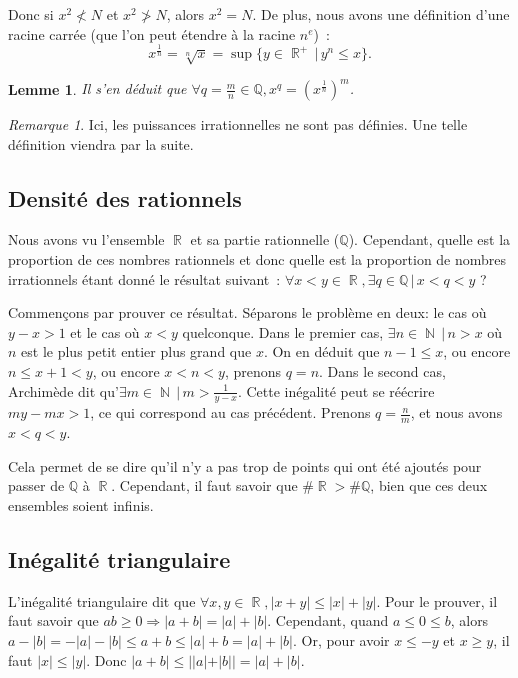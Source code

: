 \documentclass{article}
\DeclareMathOperator{\N}{\mathbb N}
\DeclareMathOperator{\R}{\mathbb R}
\newtheorem{lem}[thm]{Lemme}
\theoremstyle{definition}
\theoremstyle{remark}
\newtheorem*{rmq}{Remarque}
\begin{document}
			Donc si $x^2 \not < N$ et $x^2 \not > N$, alors $x^2 = N$. De plus, nous avons une définition d'une racine carrée (que l'on peut étendre à
			la racine $n^e$)~:
			\[x^\frac 1n = \sqrt[n] x = \sup \{y \in \R^+ \, | \, y^n \leq x\}.\]

			\begin{lem} Il s'en déduit que $\forall q = \frac mn \in \mathbb Q, x^q = (x^{\frac 1n})^m$. \end{lem}

			\begin{rmq} Ici, les puissances irrationnelles ne sont pas définies. Une telle définition viendra par la suite. \end{rmq}

	\subsection{Densité des rationnels}
		Nous avons vu l'ensemble $\R$ et sa partie rationnelle ($\mathbb Q$). Cependant, quelle est la proportion de ces nombres rationnels
		et donc quelle est la proportion de nombres irrationnels étant donné le résultat suivant~: $\forall x < y \in \R, \exists q \in \mathbb Q \, | \, x < q < y$ ?

		Commençons par prouver ce résultat. Séparons le problème en deux: le cas où $y - x > 1$ et le cas où $x < y$ quelconque. Dans le premier cas,
		$\exists n \in \N \, | \, n > x$ où $n$ est le plus petit entier plus grand que $x$. On en déduit que $n-1 \leq x$, ou encore
		$n \leq x + 1 < y$, ou encore $x < n < y$, prenons $q = n$. Dans le second cas, Archimède dit qu'$\exists m \in \N \, | \, m > \frac {1}{y - x}$.
		Cette inégalité peut se réécrire $my - mx > 1$, ce qui correspond au cas précédent. Prenons $q = \frac nm$, et nous avons $x < q < y$.

		Cela permet de se dire qu'il n'y a pas trop de points qui ont été ajoutés pour passer de $\mathbb Q$ à $\R$. Cependant, il faut savoir
		que $\#\R > \#\mathbb Q$, bien que ces deux ensembles soient infinis.

	\subsection{Inégalité triangulaire}
		L'inégalité triangulaire dit que $\forall x, y \in \R, |x + y| \leq |x| + |y|$. Pour le prouver, il faut savoir que $ab \geq 0 \Rightarrow |a + b| = |a| + |b|$.
		Cependant, quand $a \leq 0 \leq b$, alors $a - |b| = - |a| - |b| \leq a + b \leq |a| + b = |a| + |b|$. Or, pour avoir $x \leq -y$ et $x \geq y$,
		il faut $|x| \leq |y|$. Donc $|a + b| \leq ||a| + |b|| = |a| + |b|$.
\end{document}
